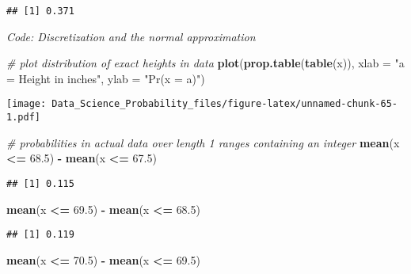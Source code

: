 \documentclass[
]{article}
\newenvironment{Shaded}{\begin{snugshade}}{\end{snugshade}}
\newcommand{\CommentTok}[1]{\textcolor[rgb]{0.56,0.35,0.01}{\textit{#1}}}
\newcommand{\DataTypeTok}[1]{\textcolor[rgb]{0.13,0.29,0.53}{#1}}
\newcommand{\FloatTok}[1]{\textcolor[rgb]{0.00,0.00,0.81}{#1}}
\newcommand{\KeywordTok}[1]{\textcolor[rgb]{0.13,0.29,0.53}{\textbf{#1}}}
\newcommand{\NormalTok}[1]{#1}
\newcommand{\OperatorTok}[1]{\textcolor[rgb]{0.81,0.36,0.00}{\textbf{#1}}}
\newcommand{\StringTok}[1]{\textcolor[rgb]{0.31,0.60,0.02}{#1}}
\begin{document}
\begin{verbatim}
## [1] 0.371
\end{verbatim}

\emph{Code: Discretization and the normal approximation}

\begin{Shaded}
\begin{Highlighting}[]
\CommentTok{\# plot distribution of exact heights in data}
\KeywordTok{plot}\NormalTok{(}\KeywordTok{prop.table}\NormalTok{(}\KeywordTok{table}\NormalTok{(x)), }\DataTypeTok{xlab =} \StringTok{"a = Height in inches"}\NormalTok{, }\DataTypeTok{ylab =} \StringTok{"Pr(x = a)"}\NormalTok{)}
\end{Highlighting}
\end{Shaded}

\texttt{[image: Data\_Science\_Probability\_files/figure-latex/unnamed-chunk-65-1.pdf]}

\begin{Shaded}
\begin{Highlighting}[]
\CommentTok{\# probabilities in actual data over length 1 ranges containing an integer}
\KeywordTok{mean}\NormalTok{(x }\OperatorTok{\textless{}=}\StringTok{ }\FloatTok{68.5}\NormalTok{) }\OperatorTok{{-}}\StringTok{ }\KeywordTok{mean}\NormalTok{(x }\OperatorTok{\textless{}=}\StringTok{ }\FloatTok{67.5}\NormalTok{)}
\end{Highlighting}
\end{Shaded}

\begin{verbatim}
## [1] 0.115
\end{verbatim}

\begin{Shaded}
\begin{Highlighting}[]
\KeywordTok{mean}\NormalTok{(x }\OperatorTok{\textless{}=}\StringTok{ }\FloatTok{69.5}\NormalTok{) }\OperatorTok{{-}}\StringTok{ }\KeywordTok{mean}\NormalTok{(x }\OperatorTok{\textless{}=}\StringTok{ }\FloatTok{68.5}\NormalTok{)}
\end{Highlighting}
\end{Shaded}

\begin{verbatim}
## [1] 0.119
\end{verbatim}

\begin{Shaded}
\begin{Highlighting}[]
\KeywordTok{mean}\NormalTok{(x }\OperatorTok{\textless{}=}\StringTok{ }\FloatTok{70.5}\NormalTok{) }\OperatorTok{{-}}\StringTok{ }\KeywordTok{mean}\NormalTok{(x }\OperatorTok{\textless{}=}\StringTok{ }\FloatTok{69.5}\NormalTok{)}
\end{Highlighting}
\end{Shaded}
\end{document}
